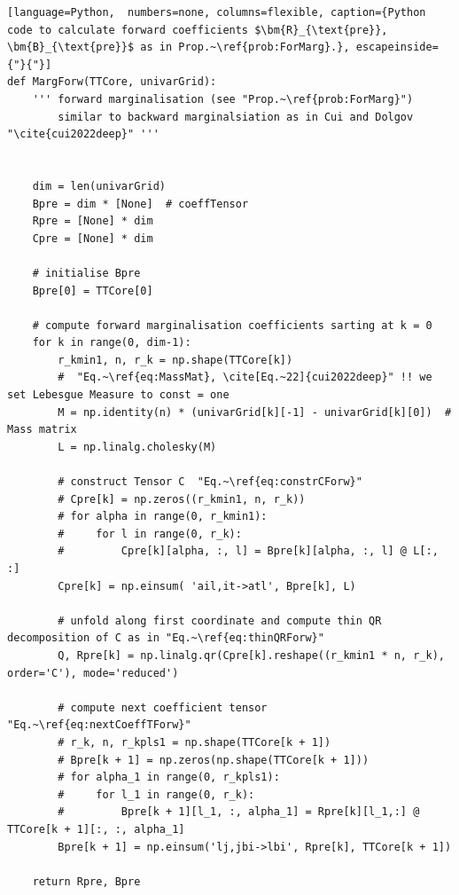 \begin{lstlisting}[language=Python,  numbers=none, columns=flexible, caption={Python code to calculate forward coefficients $\bm{R}_{\text{pre}}, \bm{B}_{\text{pre}}$ as in Prop.~\ref{prob:ForMarg}.}, escapeinside={"}{"}]
def MargForw(TTCore, univarGrid):
	''' forward marginalisation (see "Prop.~\ref{prob:ForMarg}") 
		similar to backward marginalsiation as in Cui and Dolgov "\cite{cui2022deep}" '''
	

	dim = len(univarGrid)
	Bpre = dim * [None]  # coeffTensor
	Rpre = [None] * dim
	Cpre = [None] * dim
	
	# initialise Bpre
	Bpre[0] = TTCore[0]
	
	# compute forward marginalisation coefficients sarting at k = 0
	for k in range(0, dim-1):
		r_kmin1, n, r_k = np.shape(TTCore[k])
		#  "Eq.~\ref{eq:MassMat}, \cite[Eq.~22]{cui2022deep}" !! we set Lebesgue Measure to const = one
		M = np.identity(n) * (univarGrid[k][-1] - univarGrid[k][0])  # Mass matrix
		L = np.linalg.cholesky(M)
		
		# construct Tensor C  "Eq.~\ref{eq:constrCForw}"
		# Cpre[k] = np.zeros((r_kmin1, n, r_k))
		# for alpha in range(0, r_kmin1):
		#     for l in range(0, r_k):
		#         Cpre[k][alpha, :, l] = Bpre[k][alpha, :, l] @ L[:, :]
		Cpre[k] = np.einsum( 'ail,it->atl', Bpre[k], L)
		
		# unfold along first coordinate and compute thin QR decomposition of C as in "Eq.~\ref{eq:thinQRForw}"
		Q, Rpre[k] = np.linalg.qr(Cpre[k].reshape((r_kmin1 * n, r_k), order='C'), mode='reduced')
		
		# compute next coefficient tensor  "Eq.~\ref{eq:nextCoeffTForw}"
		# r_k, n, r_kpls1 = np.shape(TTCore[k + 1])
		# Bpre[k + 1] = np.zeros(np.shape(TTCore[k + 1]))
		# for alpha_1 in range(0, r_kpls1):
		#     for l_1 in range(0, r_k):
		#         Bpre[k + 1][l_1, :, alpha_1] = Rpre[k][l_1,:] @ TTCore[k + 1][:, :, alpha_1]
		Bpre[k + 1] = np.einsum('lj,jbi->lbi', Rpre[k], TTCore[k + 1])
		
	return Rpre, Bpre
	
\end{lstlisting}


